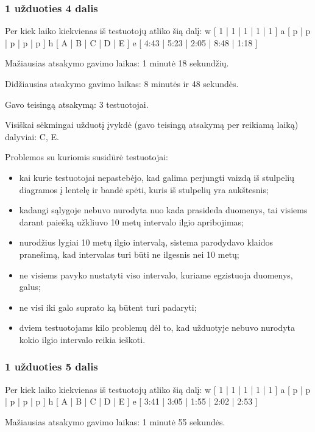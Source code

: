 \subsubsection{1 užduoties 4 dalis}

Per kiek laiko kiekvienas iš testuotojų atliko šią dalį:
\xtable
{
  w [ 1 | 1 | 1 | 1 | 1 ]
  a [ p | p | p | p | p ]
  h [ A | B | C | D | E ]
  e [ 4:43 | 5:23 | 2:05 | 8:48 | 1:18 ]
}

Mažiausias atsakymo gavimo laikas: 1 minutė 18 sekundžių.

Didžiausias atsakymo gavimo laikas: 8 minutės ir 48 sekundės.

Gavo teisingą atsakymą: 3 testuotojai.

Visiškai sėkmingai užduotį įvykdė (gavo teisingą atsakymą per reikiamą 
laiką) dalyviai: C, E.

Problemos su kuriomis susidūrė testuotojai:
\begin{itemize}
  \item kai kurie testuotojai nepastebėjo, kad galima perjungti vaizdą
    iš stulpelių diagramos į lentelę ir bandė spėti, kuris iš stulpelių
    yra aukštesnis;
  \item kadangi sąlygoje nebuvo nurodyta nuo kada prasideda duomenys,
    tai visiems darant paiešką užkliuvo 10 metų intervalo ilgio
    apribojimas;
  \item nurodžius lygiai 10 metų ilgio intervalą, sistema parodydavo
    klaidos pranešimą, kad intervalas turi būti ne ilgesnis nei 10 metų;
  \item ne visiems pavyko nustatyti viso intervalo, kuriame egzistuoja
    duomenys, galus;
  \item ne visi iki galo suprato ką būtent turi padaryti;
  \item dviem testuotojams kilo problemų dėl to, kad užduotyje nebuvo
    nurodyta kokio ilgio intervalo reikia ieškoti.
\end{itemize}

\subsubsection{1 užduoties 5 dalis}

Per kiek laiko kiekvienas iš testuotojų atliko šią dalį:
\xtable
{
  w [ 1 | 1 | 1 | 1 | 1 ]
  a [ p | p | p | p | p ]
  h [ A | B | C | D | E ]
  e [ 3:41 | 3:05 | 1:55 | 2:02 | 2:53 ]
}

Mažiausias atsakymo gavimo laikas: 1 minutė 55 sekundės.


